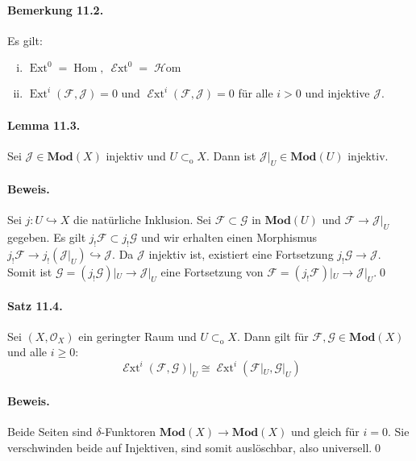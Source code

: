 \paragraph{Bemerkung 11.2.}\label{11.2} Es gilt:
\begin{enumerate}[(i)]
\item $\operatorname{Ext}^0=\operatorname{Hom},\ \operatorname{\mathcal{E}xt}^0 =\operatorname{\mathcal{H}om}$
\item $\operatorname{Ext}^i(\mathcal{F},\mathcal{J})=0$ und $\operatorname{\mathcal{E}xt}^i(\mathcal{F},\mathcal{J})=0$ für alle $i>0$ und injektive $\mathcal{J}$.
\end{enumerate}

\paragraph{Lemma 11.3.}\label{11.3} Sei $\mathcal{J}\in\mathbf{Mod}(X)$ injektiv und $U\subset_\text{o}X$. Dann ist $\mathcal{J}|_U\in\mathbf{Mod}(U)$ injektiv.

\paragraph{Beweis.} Sei $j:U\hookrightarrow X$ die natürliche Inklusion. Sei $\mathcal{F}\subset\mathcal{G}$ in $\mathbf{Mod}(U)$ und $\mathcal{F}\to\mathcal{J}|_U$ gegeben. Es gilt $j_!\mathcal{F}\subset j_!\mathcal{G}$ und wir erhalten einen Morphismus $j_!\mathcal{F}\to j_!(\mathcal{J}|_U)\hookrightarrow\mathcal{J}$. Da $\mathcal{J}$ injektiv ist, existiert eine Fortsetzung $j_!\mathcal{G}\to\mathcal{J}$. Somit ist $\mathcal{G}=(j_!\mathcal{G})|_U\to\mathcal{J}|_U$ eine Fortsetzung von $\mathcal{F}=(j_!\mathcal{F})|_U\to\mathcal{J}|_U$.\qed

\paragraph{Satz 11.4.}\label{11.4} Sei $(X,\mathcal{O}_X)$ ein geringter Raum und $U\subset_\text{o} X$. Dann gilt für $\mathcal{F},\mathcal{G}\in\mathbf{Mod}(X)$ und alle $i\geq 0$:
\[\operatorname{\mathcal{E}xt}^i(\mathcal{F},\mathcal{G})|_U\cong \operatorname{\mathcal{E}xt}^i(\mathcal{F}|_U,\mathcal{G}|_U) \]

\paragraph{Beweis.} Beide Seiten sind $\delta$-Funktoren $\mathbf{Mod}(X)\to\mathbf{Mod}(X)$ und gleich für $i=0$. Sie verschwinden beide auf Injektiven, sind somit auslöschbar, also universell.\qed

